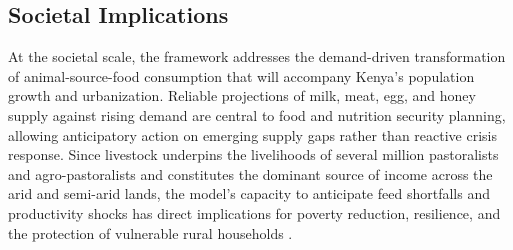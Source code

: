 \subsection{Societal Implications}
At the societal scale, the framework addresses the demand-driven transformation of animal-source-food consumption that will accompany Kenya’s population growth and urbanization. Reliable projections of milk, meat, egg, and honey supply against rising demand are central to food and nutrition security planning, allowing anticipatory action on emerging supply gaps rather than reactive crisis response. Since livestock underpins the livelihoods of several million pastoralists and agro-pastoralists and constitutes the dominant source of income across the arid and semi-arid lands, the model's capacity to anticipate feed shortfalls and productivity shocks has direct implications for poverty reduction, resilience, and the protection of vulnerable rural households \cite{behnke2011}.
